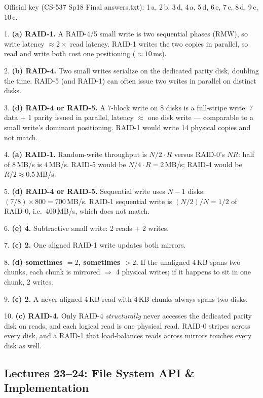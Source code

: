 \documentclass[11pt,a4paper]{article}
\newenvironment{Sol}{%
  \begin{tcolorbox}[sboxstyle, title={Solution}]%
}{%
  \end{tcolorbox}\vspace{0.35em}%
}
\begin{document}
\begin{Sol}
Official key (CS-537 Sp18 Final answers.txt):
1\,a, 2\,b, 3\,d, 4\,a, 5\,d, 6\,e, 7\,c, 8\,d, 9\,c, 10\,c.

1. \textbf{(a) RAID-1.} A RAID-4/5 small write is two sequential phases
(RMW), so write latency $\approx 2\times$ read latency. RAID-1 writes
the two copies in parallel, so read and write both cost one positioning
($\approx 10$\,ms).

2. \textbf{(b) RAID-4.} Two small writes serialize on the dedicated
parity disk, doubling the time. RAID-5 (and RAID-1) can often issue
two writes in parallel on distinct disks.

3. \textbf{(d) RAID-4 or RAID-5.} A 7-block write on 8 disks is a
full-stripe write: 7 data $+$ 1 parity issued in parallel, latency
$\approx$ one disk write --- comparable to a small write's dominant
positioning. RAID-1 would write 14 physical copies and not match.

4. \textbf{(a) RAID-1.} Random-write throughput is $N/2\cdot R$ versus
RAID-0's $NR$: half of $8$\,MB/s is $4$\,MB/s. RAID-5 would be
$N/4\cdot R = 2$\,MB/s; RAID-4 would be $R/2 \approx 0.5$\,MB/s.

5. \textbf{(d) RAID-4 or RAID-5.} Sequential write uses $N-1$ disks:
$(7/8)\times 800 = 700$\,MB/s. RAID-1 sequential write is
$(N/2)/N = 1/2$ of RAID-0, i.e.\ $400$\,MB/s, which does not match.

6. \textbf{(e) 4.} Subtractive small write: 2 reads $+$ 2 writes.

7. \textbf{(c) 2.} One aligned RAID-1 write updates both mirrors.

8. \textbf{(d) sometimes $=2$, sometimes $>2$.} If the unaligned 4\,KB
spans two chunks, each chunk is mirrored $\Rightarrow$ 4 physical
writes; if it happens to sit in one chunk, 2 writes.

9. \textbf{(c) 2.} A never-aligned 4\,KB read with 4\,KB chunks always
spans two disks.

10. \textbf{(c) RAID-4.} Only RAID-4 \emph{structurally} never accesses
the dedicated parity disk on reads, and each logical read is one
physical read. RAID-0 stripes across every disk, and a RAID-1 that
load-balances reads across mirrors touches every disk as well.
\end{Sol}

\subsection{Lectures 23--24: File System API \& Implementation}
\end{document}
